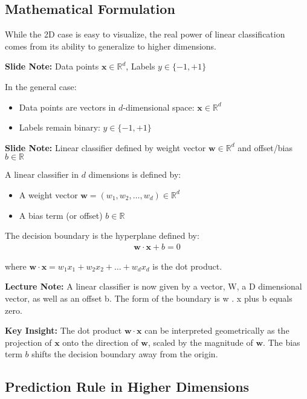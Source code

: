 \documentclass{article}
\newcommand{\slidenote}[1]{\begin{mdframed}[backgroundcolor=blue!10, linewidth=0pt]
\textbf{Slide Note:} #1
\end{mdframed}}
\newcommand{\lecturenote}[1]{\begin{mdframed}[backgroundcolor=green!10, linewidth=0pt]
\textbf{Lecture Note:} #1
\end{mdframed}}
\newcommand{\insight}[1]{\begin{mdframed}[backgroundcolor=yellow!10, linewidth=0pt]
\textbf{Key Insight:} #1
\end{mdframed}}
\begin{document}
\subsection{Mathematical Formulation}

While the 2D case is easy to visualize, the real power of linear classification comes from its ability to generalize to higher dimensions.

\slidenote{Data points $\mathbf{x} \in \mathbb{R}^d$, Labels $y \in \{-1, +1\}$}

In the general case:
\begin{itemize}
    \item Data points are vectors in $d$-dimensional space: $\mathbf{x} \in \mathbb{R}^d$
    \item Labels remain binary: $y \in \{-1, +1\}$
\end{itemize}

\slidenote{Linear classifier defined by weight vector $\mathbf{w} \in \mathbb{R}^d$ and offset/bias $b \in \mathbb{R}$}

A linear classifier in $d$ dimensions is defined by:
\begin{itemize}
    \item A weight vector $\mathbf{w} = (w_1, w_2, \ldots, w_d) \in \mathbb{R}^d$
    \item A bias term (or offset) $b \in \mathbb{R}$
\end{itemize}

The decision boundary is the hyperplane defined by:
\begin{align}
    \mathbf{w} \cdot \mathbf{x} + b = 0
\end{align}

where $\mathbf{w} \cdot \mathbf{x} = w_1x_1 + w_2x_2 + \ldots + w_dx_d$ is the dot product.

\lecturenote{A linear classifier is now given by a vector, W, a D dimensional vector, as well as an offset b. The form of the boundary is w . x plus b equals zero.}

\insight{The dot product $\mathbf{w} \cdot \mathbf{x}$ can be interpreted geometrically as the projection of $\mathbf{x}$ onto the direction of $\mathbf{w}$, scaled by the magnitude of $\mathbf{w}$. The bias term $b$ shifts the decision boundary away from the origin.}

\subsection{Prediction Rule in Higher Dimensions}
\end{document}
